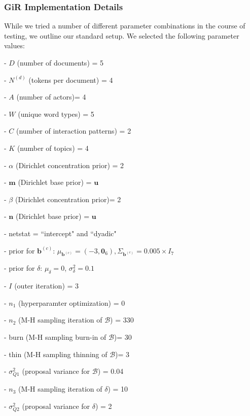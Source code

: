 \documentclass[a4paper]{article}
\begin{document}
        \subsubsection{GiR Implementation Details} \label{subsubsec: GiR implementation}
        While we tried a number of different parameter combinations in the course of testing, we outline our standard setup. We selected the following parameter values:
        \begin{itemize}
        	\begin{minipage}{0.49\textwidth}
        		\item[-] $D$ (number of documents) = 5
        		\item[-] $N^{(d)}$ (tokens per document) = 4
        		\item[-] $A$ (number of actors)= 4
        		\item[-] $W$ (unique word types) = 5
        		\item[-] $C$ (number of interaction patterns) = 2
        		\item[-] $K$ (number of topics) = 4
        		\item[-] $\alpha$ (Dirichlet concentration prior) = 2
        		\item[-] $\boldsymbol{m}$ (Dirichlet base prior) = $\boldsymbol{u}$ 
        		\item[-] $\beta$ (Dirichlet concentration prior)= 2
        		\item[-] $\boldsymbol{n}$ (Dirichlet base prior) = $\boldsymbol{u}$
        		\item[-] netstat = ``intercept" and ``dyadic"
        	\end{minipage}
        	\begin{minipage}{0.49\textwidth}
        		\item[-] prior for $\boldsymbol{b}^{(c)}$: $\mu_{\boldsymbol{b}^{(c)}} = (-3,\boldsymbol{0}_6), \Sigma_{\boldsymbol{b}^{(c)}} = 0.005\times I_7$
        		\item[-] prior for $\delta$: $\mu_\delta = 0$, $\sigma^2_\delta = 0.1$
        		\item[-] $I$ (outer iteration) = 3
        		\item[-] $n_1$ (hyperparamter optimization) = 0
        		\item[-] $n_2$ (M-H sampling iteration of $\mathcal{B}$) = 330
        		\item[-] burn (M-H sampling burn-in of $\mathcal{B}$)= 30
        		\item[-] thin (M-H sampling thinning of $\mathcal{B}$)= 3
        		\item[-] $\sigma_{Q1}^2$ (proposal variance for $\mathcal{B}$) = 0.04
        		\item[-] $n_3$ (M-H sampling iteration of $\delta$) = 10
        		\item[-] $\sigma_{Q2}^2$ (proposal variance for $\delta$) = 2
        	\end{minipage}
        \end{itemize}
  
\end{document}
